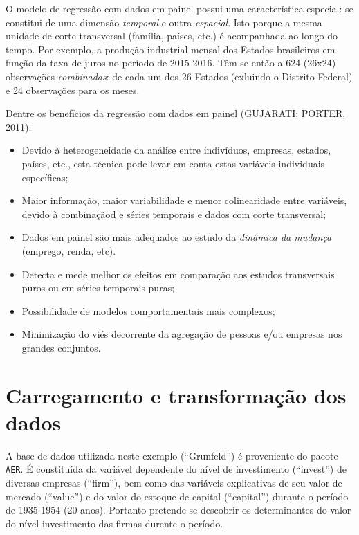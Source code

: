 \documentclass[12pt,brazil,oneside]{book}
\begin{document}
O modelo de regressão com dados em painel possui uma característica especial: se constitui de uma dimensão \emph{temporal} e outra \emph{espacial}. Isto porque a mesma unidade de corte transversal (família, países, etc.) é acompanhada ao longo do tempo. Por exemplo, a produção industrial mensal dos Estados brasileiros em função da taxa de juros no período de 2015-2016. Têm-se então a 624 (26x24) observações \emph{combinadas}: de cada um dos 26 Estados (exluindo o Distrito Federal) e 24 observações para os meses.

Dentre os benefícios da regressão com dados em painel (GUJARATI; PORTER, \protect\hyperlink{ref-Gujarati2011}{2011}):

\begin{itemize}
\item
  Devido à heterogeneidade da análise entre indivíduos, empresas, estados, países, etc., esta técnica pode levar em conta estas variáveis individuais específicas;
\item
  Maior informação, maior variabilidade e menor colinearidade entre variáveis, devido à combinaçãod e séries temporais e dados com corte transversal;
\item
  Dados em painel são mais adequados ao estudo da \emph{dinâmica da mudança} (emprego, renda, etc).
\item
  Detecta e mede melhor os efeitos em comparação aos estudos transversais puros ou em séries temporais puras;
\item
  Possibilidade de modelos comportamentais mais complexos;
\item
  Minimização do viés decorrente da agregação de pessoas e/ou empresas nos grandes conjuntos.
\end{itemize}

\hypertarget{carregamento-e-transformacao-dos-dados}{%
\section{Carregamento e transformação dos dados}\label{carregamento-e-transformacao-dos-dados}}

A base de dados utilizada neste exemplo (``Grunfeld'') é proveniente do pacote \texttt{AER}. É constituída da variável dependente do nível de investimento (``invest'') de diversas empresas (``firm''), bem como das variáveis explicativas de seu valor de mercado (``value'') e do valor do estoque de capital (``capital'') durante o período de 1935-1954 (20 anos). Portanto pretende-se descobrir os determinantes do valor do nível investimento das firmas durente o período.
\end{document}
